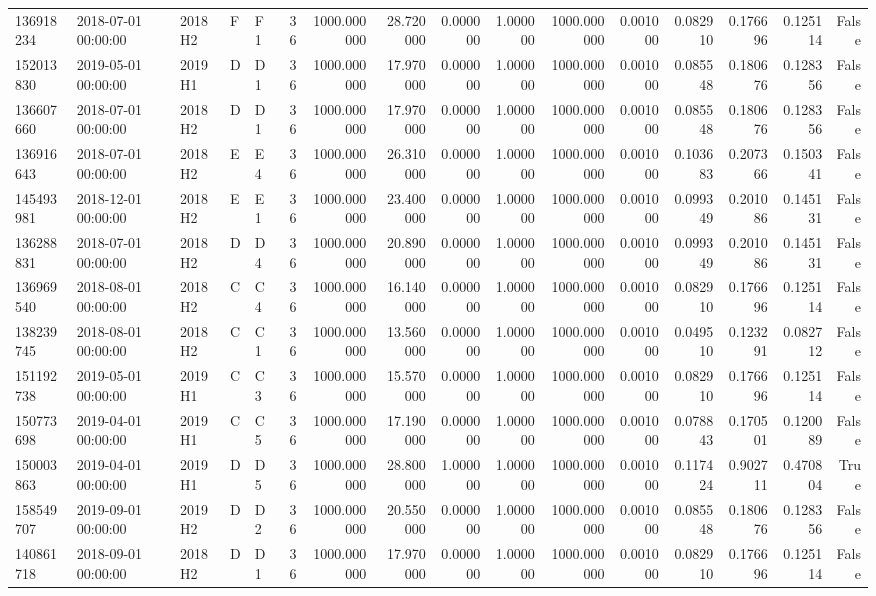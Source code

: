 \begin{tabular}{lllllrrrrrrrrrrr}
136918234 & 2018-07-01 00:00:00 & 2018H2 & F & F1 & 36 & 1000.000000 & 28.720000 & 0.000000 & 1.000000 & 1000.000000 & 0.001000 & 0.082910 & 0.176696 & 0.125114 & False \\
152013830 & 2019-05-01 00:00:00 & 2019H1 & D & D1 & 36 & 1000.000000 & 17.970000 & 0.000000 & 1.000000 & 1000.000000 & 0.001000 & 0.085548 & 0.180676 & 0.128356 & False \\
136607660 & 2018-07-01 00:00:00 & 2018H2 & D & D1 & 36 & 1000.000000 & 17.970000 & 0.000000 & 1.000000 & 1000.000000 & 0.001000 & 0.085548 & 0.180676 & 0.128356 & False \\
136916643 & 2018-07-01 00:00:00 & 2018H2 & E & E4 & 36 & 1000.000000 & 26.310000 & 0.000000 & 1.000000 & 1000.000000 & 0.001000 & 0.103683 & 0.207366 & 0.150341 & False \\
145493981 & 2018-12-01 00:00:00 & 2018H2 & E & E1 & 36 & 1000.000000 & 23.400000 & 0.000000 & 1.000000 & 1000.000000 & 0.001000 & 0.099349 & 0.201086 & 0.145131 & False \\
136288831 & 2018-07-01 00:00:00 & 2018H2 & D & D4 & 36 & 1000.000000 & 20.890000 & 0.000000 & 1.000000 & 1000.000000 & 0.001000 & 0.099349 & 0.201086 & 0.145131 & False \\
136969540 & 2018-08-01 00:00:00 & 2018H2 & C & C4 & 36 & 1000.000000 & 16.140000 & 0.000000 & 1.000000 & 1000.000000 & 0.001000 & 0.082910 & 0.176696 & 0.125114 & False \\
138239745 & 2018-08-01 00:00:00 & 2018H2 & C & C1 & 36 & 1000.000000 & 13.560000 & 0.000000 & 1.000000 & 1000.000000 & 0.001000 & 0.049510 & 0.123291 & 0.082712 & False \\
151192738 & 2019-05-01 00:00:00 & 2019H1 & C & C3 & 36 & 1000.000000 & 15.570000 & 0.000000 & 1.000000 & 1000.000000 & 0.001000 & 0.082910 & 0.176696 & 0.125114 & False \\
150773698 & 2019-04-01 00:00:00 & 2019H1 & C & C5 & 36 & 1000.000000 & 17.190000 & 0.000000 & 1.000000 & 1000.000000 & 0.001000 & 0.078843 & 0.170501 & 0.120089 & False \\
150003863 & 2019-04-01 00:00:00 & 2019H1 & D & D5 & 36 & 1000.000000 & 28.800000 & 1.000000 & 1.000000 & 1000.000000 & 0.001000 & 0.117424 & 0.902711 & 0.470804 & True \\
158549707 & 2019-09-01 00:00:00 & 2019H2 & D & D2 & 36 & 1000.000000 & 20.550000 & 0.000000 & 1.000000 & 1000.000000 & 0.001000 & 0.085548 & 0.180676 & 0.128356 & False \\
140861718 & 2018-09-01 00:00:00 & 2018H2 & D & D1 & 36 & 1000.000000 & 17.970000 & 0.000000 & 1.000000 & 1000.000000 & 0.001000 & 0.082910 & 0.176696 & 0.125114 & False \\

\end{tabular}
